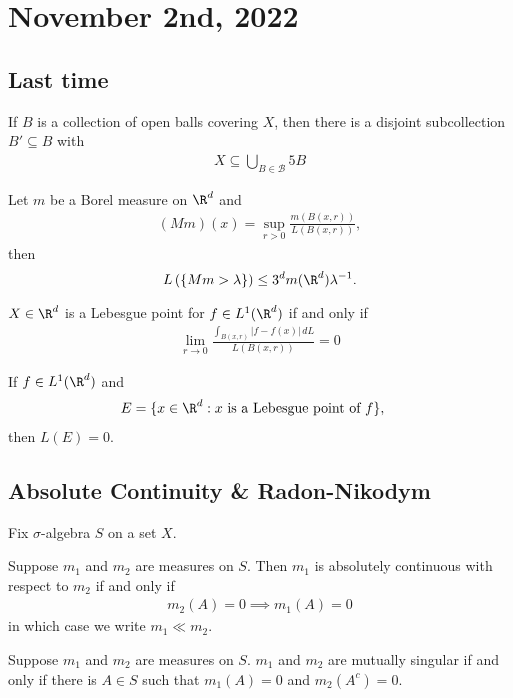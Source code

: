 \section{November 2nd, 2022}

\subsection*{Last time}

\begin{theorem}[Vitali]
	If $B$ is a collection of open balls covering $X$, then there is a disjoint subcollection $B' \subseteq B$ with
	\begin{align*}
		X \subseteq \bigcup_{B \in \mathcal{B}} 5 B
	\end{align*}
\end{theorem}

\begin{theorem}
	Let $m$ be a Borel measure on $\R^{d}$ and
	\begin{align*}
		(M m )(x) = \sup_{r > 0} \frac{m (B(x, r))}{L (B(x,r))},
	\end{align*}
  then
  \[
		L\left( \{ M m > \lambda \} \right) \leq 3^{d} m (\R^d) \lambda^{-1}.
  \]
\end{theorem}

\begin{definition}
	$X \in \R^{d}$ is a Lebesgue point for $f \in L^{1} ( \R^{d} )$ if and only if
	\begin{align*}
		\lim_{r \to 0} \frac{\int_{B(x, r)} | f - f(x) | \, dL}{L (B(x, r))} = 0
	\end{align*}
\end{definition}

\begin{definition}
	If $f \in L^{1}( \R^{d})$ and
	\begin{align*}
		&E = \{ x \in \R^{d} : x \text{ is a Lebesgue point of } f \},
	\end{align*}
	then $L(E) = 0$.
\end{definition}


\subsection{Absolute Continuity \& Radon-Nikodym}

\noindent Fix $\sigma$-algebra $S$ on a set $X$.

\begin{definition}
	Suppose $m_1$ and $m_{2}$ are measures on $S$. Then $m_1$ is absolutely continuous with respect to $m_{2}$ if and only if
	\begin{align*}
		m_{2} (A) = 0 \implies m_1 (A) = 0
	\end{align*} in which case we write $m_1 \ll m_2$.
\end{definition}
\begin{definition}
	Suppose $m_1$ and $m_2$ are measures on $S$. $m_1$ and $m_2$ are mutually singular if and only if there is $A \in S$ such that $m_1(A) = 0$ and $m_2(A^c) = 0$.
\end{definition}

